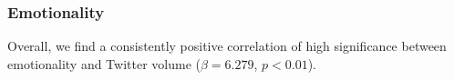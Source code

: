 \documentclass[letterpaper]{article}
\begin{document}
\subsubsection{Emotionality}
Overall, we find a consistently positive correlation of high significance between emotionality and Twitter volume ($\beta=6.279$, $p<0.01$). 


\end{document}
